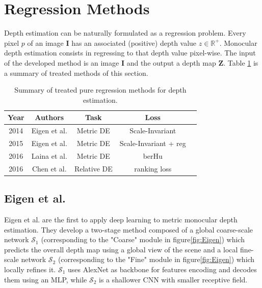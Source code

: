 \section{Regression Methods}
Depth estimation can be naturally formulated as a regression problem.
Every pixel $p$ of an image $\mathbf{I}$ has an associated (positive) depth value $z \in \mathbb{R}^{+}$.
Monocular depth estimation consists in regressing to that depth value pixel-wise.
The input of the developed method is an image $\mathbf{I}$ and the output a depth map $\mathbf{Z}$.
Table \ref{table:1} is a summary of treated methods of this section.

\label{sec:regression_methods}

\begin{table}
	\centering
	\begin{tabular}{| c | c | c | c | c |}
		\hline
		\textbf{Year} & \textbf{Authors} & \textbf{Task} & \textbf{Loss} \\
		\hline
		2014 & Eigen et al. \cite{Eigen} & Metric DE & Scale-Invariant \\
		2015 & Eigen et al. \cite{Eigen2} & Metric DE & Scale-Invariant + reg \\
		2016 & Laina et al. \cite{Laina} & Metric DE & berHu \\
		2016 & Chen et al. \cite{DIW} & Relative DE & ranking loss \\
		\hline
	\end{tabular}
	\caption[Summary of regression methods.]{Summary of treated pure regression methods for depth estimation. \label{table:1}}
\end{table}

\subsection{Eigen et al.}
Eigen et al. \cite{Eigen} are the first to apply deep learning to metric monocular depth estimation.
They develop a two-stage method composed of a global coarse-scale network $\mathcal{S}_{1}$ (corresponding to the "Coarse" module in figure\ref{fig:Eigen}) which predicts the overall depth map using a global view of the scene and a local fine-scale network $\mathcal{S}_{2}$ (corresponding to the "Fine" module in figure\ref{fig:Eigen}) which locally refines it.
$\mathcal{S}_{1}$ uses AlexNet \cite{AlexNet} as backbone for features encoding and decodes them using an MLP, while $\mathcal{S}_{2}$ is a shallower CNN with smaller receptive field.

